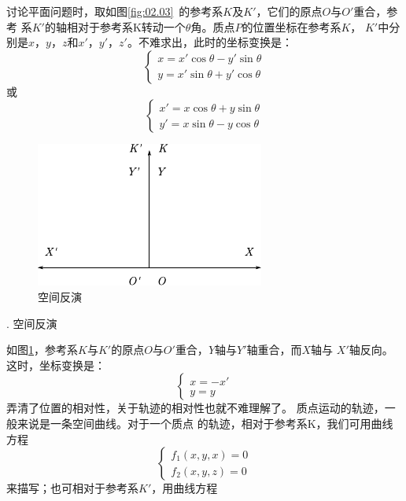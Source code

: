 讨论平面问题时，取如图\ref{fig:02.03}~的参考系$K$及$K'$，它们的原点$O$与$O'$重合，参考
系$K'$的轴相对于参考系K转动一个$\theta$角。质点$P$的位置坐标在参考系$K$，
$K'$中分别是$x$，$y$，$z$和$x'$，$y'$，$z'$。不难求出，此时的坐标变换是：\vspace{-0.2em}
\begin{equation}\label{eqn:02.02.04}
    \left\{\begin{array}{l}
        x=x'\cos\theta-y'\sin\theta \\
        y=x'\sin\theta+y'\cos\theta
    \end{array}\right.
\end{equation}
或\vspace{-1em}
\begin{equation*}
    \left\{\begin{array}{l}
        x'=x\cos\theta+y\sin\theta \\
        y'=x\sin\theta-y\cos\theta
    \end{array}\right.
\end{equation*}

\begin{figure}
    \centering
    \includegraphics{figure/fig02.04}
    \caption{空间反演}
    \label{fig:02.04}
\end{figure}
. 空间反演 \normalfont

如图\ref{fig:02.04}，参考系$K$与$K'$的原点$O$与$O'$重合，$Y$轴与$Y'$轴重合，而$X$轴与
$X'$轴反向。这时，坐标变换是：\vspace{-0.5em}
{\setlength{\mathindent}{2em}
\begin{equation}\label{eqn:02.02.05}
    \left\{\begin{array}{l}
        x=-x' \\
        y=y
    \end{array}\right.
\end{equation}}%
弄清了位置的相对性，关于轨迹的相对性也就不难理解了。
质点运动的轨迹，一般来说是一条空间曲线。对于一个质点
的轨迹，相对于参考系K，我们可用曲线方程
\begin{equation}\label{eqn:02.02.06}
    \left\{\begin{array}{l}
        f_1(x,y,x)=0 \\
        f_2(x,y,z)=0
    \end{array}\right.
\end{equation}
来描写；也可相对于参考系$K'$，用曲线方程

